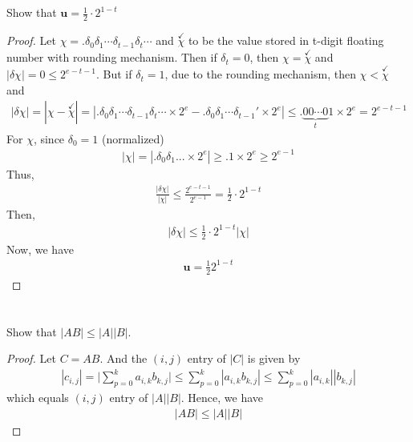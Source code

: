 \documentclass[11pt,a4paper]{article}
\newcommand{\bu}{\mathbf{u}}
\newcommand{\dchi}{\delta \chi}
\newcommand{\cchi}{\overset{\checkmark}{\chi}}
\begin{document}
\subsection{}
Show that $\bu = \frac{1}{2} \cdot 2^{1-t}$
\begin{proof}
    Let $\chi = .\delta_0 \delta_1 \cdots \delta_{t-1} \delta_t \cdots$ and 
    $\cchi$ to be the value stored in t-digit floating number with rounding
    mechanism. Then if $\delta_t = 0$, then $\chi = \cchi$ and $|\dchi| = 0 \leq 2^{e-t-1}$.
    But if $\delta_t = 1$, due to the rounding mechanism, then  $\chi < \cchi$ and 
    \begin{align}
        |\dchi| = |\chi - \cchi|
        = |.\delta_0 \delta_1 \cdots \delta_{t-1} \delta_{t} \cdots \times 2^e
            - .\delta_0 \delta_1 \cdots \delta_{t-1}' \times 2^e|
            \leq .\underbrace{00\cdots0}_{t} 1 \times 2^e = 2^{e-t-1}
    \end{align}
    For $\chi$, since $\delta_0 = 1$ (normalized)
    \begin{align}
        | \chi | = | .\delta_0 \delta_1 ... \times 2^e | \geq .1 \times 2^e  \geq 2^{e-1}
    \end{align}
    Thus, 
    \begin{align}
        \frac{|\dchi|}{|\chi|} \leq \frac{2^{e-t-1}}{2^{e-1}} = \frac{1}{2} \cdot 2^{1-t}
    \end{align}
    Then, 
    \begin{align}
        |\dchi| \leq \frac{1}{2} \cdot 2^{1-t} |\chi|
    \end{align}
    Now, we have 
    \begin{align}
        \bu =  \frac{1}{2} 2^{1-t} 
    \end{align}
\end{proof}

\setcounter{section}{9}
\section{}
Show that $|AB| \leq |A| |B|$.

\begin{proof}
Let $C=AB$. And the $(i,j)$ entry of $|C|$ is given by 
\begin{align}
    |c_{i,j}| = \big| \sum_{p=0}^{k} a_{i,k} b_{k,j} \big|  
    \leq \sum_{p=0}^{k} | a_{i,k} b_{k,j} | 
    \leq \sum_{p=0}^{k} | a_{i,k} | |  b_{k,j} | 
\end{align}
which equals $(i,j)$ entry of $|A| |B|$. Hence, we have 
\begin{align}
    |AB| \leq |A| |B|
\end{align}
\end{proof}
\end{document}
